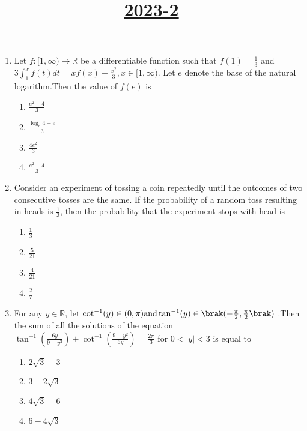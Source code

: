 \documentclass[12pt,a4paper]{article}
\begin{document}
\title{\underline{\textbf{2023-2}}}      \date{}\maketitle                    

\begin{enumerate}
\item Let $f :[1, \infty) \to \mathbb{R}$ be a differentiable function such that $f(1) = \frac{1}{3}$ and $3 \int_{1}^{x}  f(t) dt = x f(x) - \frac{x^2}{3},x \in [1, \infty).$ Let $e$ denote the base of the natural logarithm.Then the value of $f(e)$ is\\
\begin{enumerate}
\item $\frac{e^2+4}{3}$
\item $\frac{\log_{e}{4} + e}{3}$
\item $\frac{4e^2}{3}$
\item $\frac{e^2-4}{3}$
\end{enumerate}

\item Consider an experiment of tossing a coin repeatedly until the outcomes of two consecutive tosses are the same. If the probability of a random toss resulting in heads is $\frac{1}{3}$, then the probability that the experiment stops with head is\\
\begin{enumerate}
\item $\frac{1}{3}$                             \item $\frac{5}{21}$                            \item $\frac{4}{21}$
\item $\frac{2}{7}$
\end{enumerate}

\item For any $y \in \mathbb{R}$, let $\cot^{-1}(y) \in (0, \pi) \text{and} \tan^{-1}(y) \in \brak( -\frac{\pi}{2}, \frac{\pi}{2} \brak)$ .Then the sum of all the solutions of the equation $\tan^{-1}(\frac{6y}{9-y^2}) + \cot^{-1}(\frac{9-y^2}{6y}) =\frac{2\pi}{3}$ for $0 < |y| < 3$ is equal to\\
\begin{enumerate}
\item $2\sqrt{3}-3$
\item $3 - 2\sqrt{3}$
\item $4\sqrt{3} - 6$
\item $6-4\sqrt{3}$
\end{enumerate}



\end{enumerate}
\end{document}
